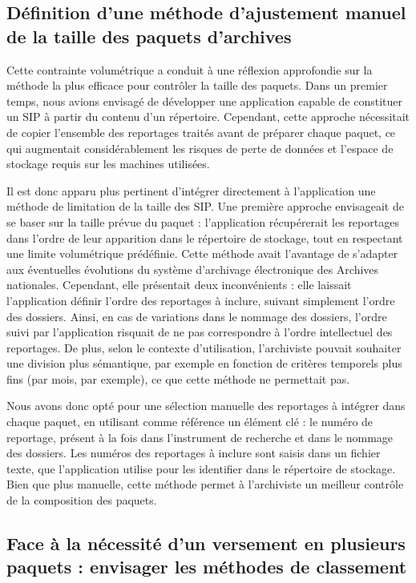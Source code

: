\subsection*{Définition d'une méthode d'ajustement manuel de la taille des paquets d'archives}

Cette contrainte volumétrique a conduit à une réflexion approfondie sur la méthode la plus efficace pour contrôler la taille des paquets. Dans un premier temps, nous avions envisagé de développer une application capable de constituer un SIP à partir du contenu d’un répertoire. Cependant, cette approche nécessitait de copier l’ensemble des reportages traités avant de préparer chaque paquet, ce qui augmentait considérablement les risques de perte de données et l’espace de stockage requis sur les machines utilisées.

Il est donc apparu plus pertinent d'intégrer directement à l'application une méthode de limitation de la taille des SIP. Une première approche envisageait de se baser sur la taille prévue du paquet : l’application récupérerait les reportages dans l’ordre de leur apparition dans le répertoire de stockage, tout en respectant une limite volumétrique prédéfinie. Cette méthode avait l’avantage de s’adapter aux éventuelles évolutions du système d'archivage électronique des Archives nationales. Cependant, elle présentait deux inconvénients : elle laissait l'application définir l'ordre des reportages à inclure, suivant simplement l’ordre des dossiers. Ainsi, en cas de variations dans le nommage des dossiers, l’ordre suivi par l’application risquait de ne pas correspondre à l’ordre intellectuel des reportages. De plus, selon le contexte d’utilisation, l'archiviste pouvait souhaiter une division plus sémantique, par exemple en fonction de critères temporels plus fins (par mois, par exemple), ce que cette méthode ne permettait pas.

Nous avons donc opté pour une sélection manuelle des reportages à intégrer dans chaque paquet, en utilisant comme référence un élément clé : le numéro de reportage, présent à la fois dans l'instrument de recherche et dans le nommage des dossiers. Les numéros des reportages à inclure sont saisis dans un fichier texte, que l'application utilise pour les identifier dans le répertoire de stockage. Bien que plus manuelle, cette méthode permet à l’archiviste un meilleur contrôle de la composition des paquets.


\subsection*{Face à la nécessité d'un versement en plusieurs paquets : envisager les méthodes de classement}

